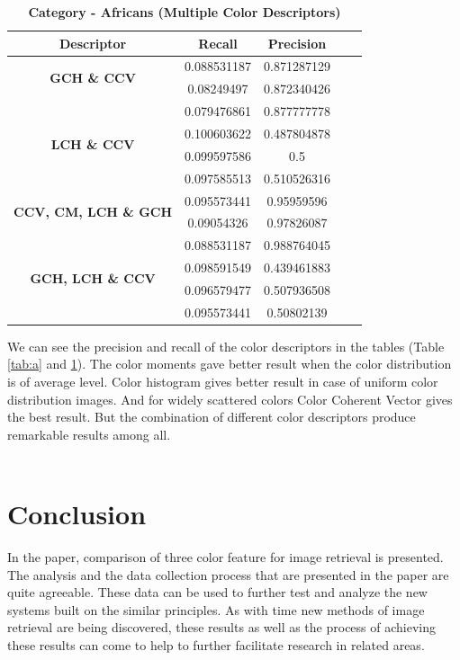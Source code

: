 \documentclass[pstricks,10pt,notitlepage]{report}
\begin{document}
\begin{table}[!h]
\caption{\textbf{Category - Africans (Multiple Color Descriptors)}}

\centering
\begin{tabular}{|c|c|c|c|c|}
\hline
Descriptor & Recall & Precision\\
\hline
\multirow{2}{*}{\textbf{GCH \& CCV}} & 0.088531187 & 0.871287129\\
& 0.08249497 & 0.872340426\\
& 0.079476861 & 0.877777778\\
\hline
\multirow{2}{*}{\textbf{LCH \& CCV}} & 0.100603622 & 0.487804878\\
& 0.099597586 & 0.5\\
& 0.097585513 & 0.510526316\\
\hline
\multirow{2}{*}{\textbf{CCV, CM, LCH \& GCH}} & 0.095573441 & 0.95959596\\
& 0.09054326 & 0.97826087\\
& 0.088531187 & 0.988764045\\
\hline
\multirow{2}{*}{\textbf{GCH, LCH \& CCV}} & 0.098591549 & 0.439461883\\
& 0.096579477 & 0.507936508\\
& 0.095573441 & 0.50802139\\
\hline
\end{tabular}
\label{tab:b}
\end{table}


We can see the precision and recall of the color descriptors in the tables (Table \ref{tab:a} and \ref{tab:b}). The color moments gave better result when the color distribution is of average level. Color histogram gives better result in case of uniform color distribution images. And for widely scattered colors Color Coherent Vector gives the best result. But the combination of different color descriptors produce remarkable results among all.\\
\\
\section{Conclusion}
In the paper, comparison of three color feature for image retrieval is presented. The analysis and the data collection process that are presented in the paper are quite agreeable. These data can be used to further test and analyze the new systems built on the similar principles. As with time new methods of image retrieval are being discovered, these results as well as the process of achieving these results can come to help to further facilitate research in related areas.




\end{document}
